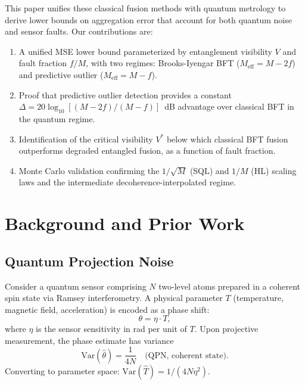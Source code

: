 \documentclass[twocolumn,11pt]{article}
\begin{document}
This paper unifies these classical fusion methods with quantum
metrology to derive lower bounds on aggregation error that account
for both quantum noise and sensor faults.
Our contributions are:
\begin{enumerate}
    \item A unified MSE lower bound parameterized by entanglement
          visibility $V$ and fault fraction $f/M$, with two regimes:
          Brooks-Iyengar BFT ($M_{\mathrm{eff}} = M-2f$) and
          predictive outlier ($M_{\mathrm{eff}} = M-f$).
    \item Proof that predictive outlier detection
          \cite{iyer2015virtual} provides a constant
          $\Delta = 20\log_{10}[(M-2f)/(M-f)]$~dB advantage over
          classical BFT in the quantum regime.
    \item Identification of the critical visibility $V^*$ below
          which classical BFT fusion outperforms degraded entangled
          fusion, as a function of fault fraction.
    \item Monte Carlo validation confirming the $1/\sqrt{M}$ (SQL)
          and $1/M$ (HL) scaling laws and the intermediate
          decoherence-interpolated regime.
\end{enumerate}


\section{Background and Prior Work}
\label{sec:background}

\subsection{Quantum Projection Noise}

Consider a quantum sensor comprising $N$ two-level atoms prepared
in a coherent spin state via Ramsey interferometry.
A physical parameter $T$ (temperature, magnetic field, acceleration)
is encoded as a phase shift:
\begin{equation}
    \theta = \eta \cdot T,
    \label{eq:phase}
\end{equation}
where $\eta$ is the sensor sensitivity in rad per unit of $T$.
Upon projective measurement, the phase estimate has variance
\begin{equation}
    \mathrm{Var}(\hat{\theta}) = \frac{1}{4N}
    \quad \text{(QPN, coherent state)}.
    \label{eq:qpn}
\end{equation}
Converting to parameter space: $\mathrm{Var}(\hat{T}) = 1/(4N\eta^2)$.
\end{document}
